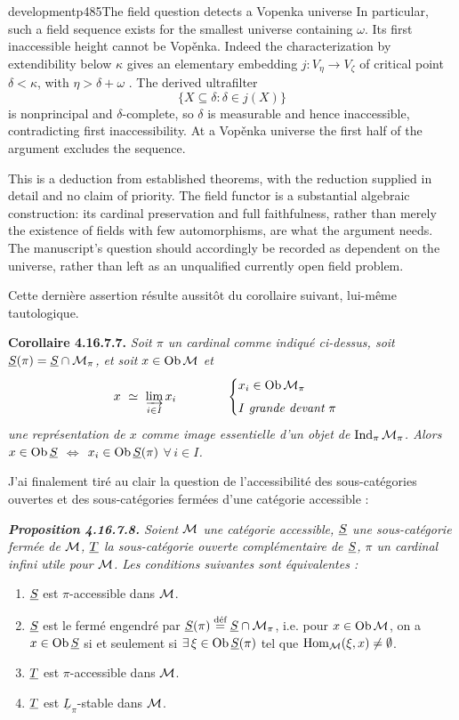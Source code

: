 \begin{dcomment}{development}{p485}{The field question detects a Vopenka universe}
In particular, such a field sequence exists for the smallest universe containing $\omega$. Its first inaccessible height cannot be Vop\v{e}nka. Indeed the characterization by extendibility below $\kappa$ gives an elementary embedding $j:V_\eta\to V_\zeta$ of critical point $\delta<\kappa$, with $\eta>\delta+\omega$ \citep[Proposition~7]{BrookeTaylor2011Vopenka}. The derived ultrafilter
\[
\{X\subseteq\delta:\delta\in j(X)\}
\]
is nonprincipal and $\delta$-complete, so $\delta$ is measurable and hence inaccessible, contradicting first inaccessibility. At a Vop\v{e}nka universe the first half of the argument excludes the sequence.

This is a deduction from established theorems, with the reduction supplied in detail and no claim of priority. The field functor is a substantial algebraic construction: its cardinal preservation and full faithfulness, rather than merely the existence of fields with few automorphisms, are what the argument needs. The manuscript's question should accordingly be recorded as dependent on the universe, rather than left as an unqualified currently open field problem.
\end{dcomment}


Cette dernière assertion résulte aussitôt du corollaire suivant, lui-même tautologique.

\textbf{Corollaire 4.16.7.7.} \textit{Soit $\pi$ un cardinal comme indiqué ci-dessus, soit $\underline{S}(\pi) = \underline{S} \cap \mathcal{M}_\pi$, et soit $x \in \operatorname{Ob} \mathcal{M}$ et
\[
x \ \simeq\ \varinjlim_{i\in I} x_i \qquad\qquad
\begin{cases}
x_i \in \operatorname{Ob} \mathcal{M}_\pi \\[1ex]
I \ \textit{grande devant}\ \pi
\end{cases}
\]
une représentation de $x$ comme image essentielle d'un objet de $\operatorname{Ind}_\pi \mathcal{M}_\pi$. Alors $x \in \operatorname{Ob} \underline{S}$ $\Longleftrightarrow$ $x_i \in \operatorname{Ob} \underline{S}(\pi)$ $\forall\, i \in I$.}

J'ai finalement tiré au clair la question de l'accessibilité des sous-catégories ouvertes et des sous-catégories fermées d'une catégorie accessible :

\begingroup\itshape
\noindent\textbf{\upshape Proposition 4.16.7.8.} Soient $\mathcal{M}$ une catégorie accessible, $\underline{S}$ une sous-catégorie fermée de $\mathcal{M}$, $\underline{T}$ la sous-catégorie ouverte complémentaire de $\underline{S}$, $\pi$ un cardinal infini utile pour $\mathcal{M}$. Les conditions suivantes sont équivalentes :
\begin{enumerate}[label={}]
\item[a)] $\underline{S}$ est $\pi$-accessible dans $\mathcal{M}$.
\item[a$'$)] $\underline{S}$ est le fermé engendré par $\underline{S}(\pi) \overset{\text{\upshape déf}}{=} \underline{S} \cap \mathcal{M}_\pi$, i.e. pour $x \in \operatorname{Ob} \mathcal{M}$, on a $x \in \operatorname{Ob} \underline{S}$ si et seulement si $\exists\, \xi \in \operatorname{Ob} \underline{S}(\pi)$ tel que $\operatorname{Hom}_{\mathcal{M}}(\xi, x) \neq \emptyset$.
\item[b)] $\underline{T}$ est $\pi$-accessible dans $\mathcal{M}$.
\item[b$'$)] $\underline{T}$ est $\underline{L}_\pi$-stable dans $\mathcal{M}$.
\end{enumerate}
\endgroup

